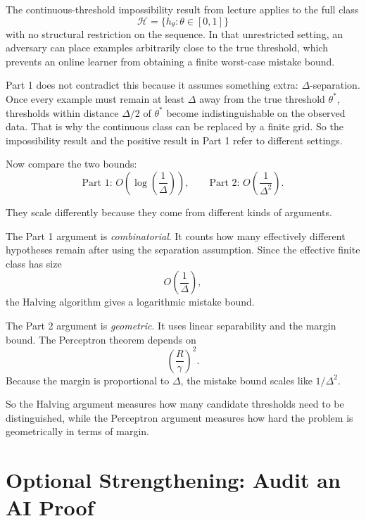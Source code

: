 \documentclass{article}
\begin{document}
\begin{solutionbox}

The continuous-threshold impossibility result from lecture applies to the full
class
\[
\mathcal{H}=\{h_\theta:\theta\in[0,1]\}
\]
with no structural restriction on the sequence. In that unrestricted setting,
an adversary can place examples arbitrarily close to the true threshold, which
prevents an online learner from obtaining a finite worst-case mistake bound.

Part 1 does not contradict this because it assumes something extra:
$\Delta$-separation. Once every example must remain at least $\Delta$ away from
the true threshold $\theta^*$, thresholds within distance $\Delta/2$ of
$\theta^*$ become indistinguishable on the observed data. That is why the
continuous class can be replaced by a finite grid. So the impossibility result
and the positive result in Part 1 refer to different settings.

Now compare the two bounds:
\[
\text{Part 1: } O\!\left(\log\left(\frac{1}{\Delta}\right)\right),
\qquad
\text{Part 2: } O\!\left(\frac{1}{\Delta^2}\right).
\]

They scale differently because they come from different kinds of arguments.

The Part 1 argument is \emph{combinatorial}. It counts how many effectively
different hypotheses remain after using the separation assumption. Since the
effective finite class has size
\[
O\!\left(\frac{1}{\Delta}\right),
\]
the Halving algorithm gives a logarithmic mistake bound.

The Part 2 argument is \emph{geometric}. It uses linear separability and the
margin bound. The Perceptron theorem depends on
\[
\left(\frac{R}{\gamma}\right)^2.
\]
Because the margin is proportional to $\Delta$, the mistake bound scales like
$1/\Delta^2$.

So the Halving argument measures how many candidate thresholds need to be
distinguished, while the Perceptron argument measures how hard the problem is
geometrically in terms of margin.

\end{solutionbox}

\section{Optional Strengthening: Audit an AI Proof}
\end{document}
